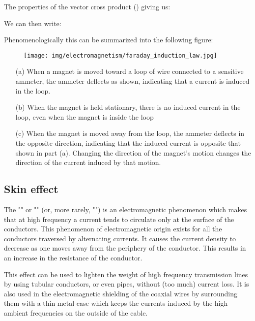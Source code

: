 	The properties of the vector cross product () giving us:
	
	We can then write:
	
	Phenomenologically this can be summarized into the following figure:
	\begin{figure}[H]
		\centering
		\texttt{[image: img/electromagnetism/faraday\_induction\_law.jpg]}
	\end{figure}
	\begin{enumerate}
		\item[(a)] When a magnet is moved toward a loop of wire connected to a sensitive ammeter, the ammeter deflects as shown, indicating that a current is induced in the loop. 
		
		\item[(b)] When the magnet is held stationary, there is no induced current in the loop, even when the magnet is inside the loop
		
		\item[(c)] When the magnet is moved away from the loop, the ammeter deflects in the opposite direction, indicating that the induced current is opposite that shown in part (a). Changing the direction of the magnet's motion changes the direction of the current induced by that motion.
	\end{enumerate}
	
	\pagebreak
	\subsection{Skin effect}
	The "" or "" (or, more rarely, "") is an electromagnetic phenomenon which makes that at high frequency a current tends to circulate only at the surface of the conductors. This phenomenon of electromagnetic origin exists for all the conductors traversed by alternating currents. It causes the current density to decrease as one moves away from the periphery of the conductor. This results in an increase in the resistance of the conductor.

	This effect can be used to lighten the weight of high frequency transmission lines by using tubular conductors, or even pipes, without (too much) current loss. It is also used in the electromagnetic shielding of the coaxial wires by surrounding them with a thin metal case which keeps the currents induced by the high ambient frequencies on the outside of the cable.
	
